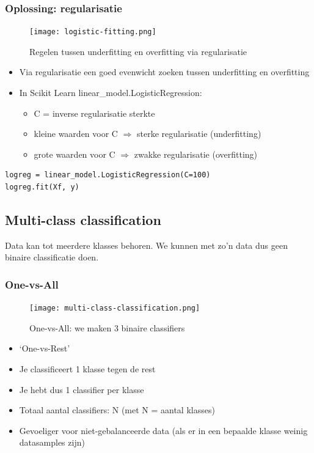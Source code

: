 \documentclass{article}
\begin{document}
\subsubsection{Oplossing: regularisatie}

\begin{figure}[H]
    \centering
    \texttt{[image: logistic-fitting.png]}
    \caption{Regelen tussen underfitting en overfitting via regularisatie}
\end{figure}

\begin{itemize}
    \item Via regularisatie een goed evenwicht zoeken tussen underfitting en overfitting
    \item In Scikit Learn linear\_model.LogisticRegression:
    \begin{itemize}
        \item C = inverse regularisatie sterkte
        \item kleine waarden voor C $\Rightarrow$ sterke regularisatie (underfitting)
        \item grote waarden voor C $\Rightarrow$ zwakke regularisatie (overfitting)
    \end{itemize}
\end{itemize}

\begin{verbatim}
logreg = linear_model.LogisticRegression(C=100)
logreg.fit(Xf, y)
\end{verbatim}

\subsection{Multi-class classification}

Data kan tot meerdere klasses behoren.
We kunnen met zo'n data dus geen binaire classificatie doen.


\subsubsection{One-vs-All}

\begin{figure}[H]
    \centering
    \texttt{[image: multi-class-classification.png]}
    \caption{One-vs-All: we maken 3 binaire classifiers}
\end{figure}


\begin{itemize}
    \item `One-vs-Rest'
    \item Je classificeert 1 klasse tegen de rest
    \item Je hebt dus 1 classifier per klasse
    \item Totaal aantal classifiers: N (met N = aantal klasses)
    \item Gevoeliger voor niet-gebalanceerde data (als er in een bepaalde klasse weinig datasamples zijn)
\end{itemize}
\end{document}

